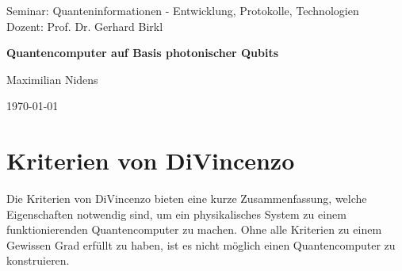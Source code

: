 \documentclass[11pt]{article}
\begin{document}
\begin{titlepage}
    \centering
    \vspace*{2cm}
    
    {\Large Seminar: Quanteninformationen - Entwicklung, Protokolle, Technologien} \\
    \vspace{0.5cm}
    {\Large Dozent: Prof. Dr. Gerhard Birkl} \\
    
    \vspace{4cm}
    
    {\Huge \bfseries Quantencomputer auf Basis photonischer Qubits} \\
    
    \vspace{4cm}
    
    {\Large Maximilian Nidens} \\
    
    \vfill
    
    {\large \today}
\end{titlepage}
\section{Kriterien von DiVincenzo}
Die Kriterien von DiVincenzo \cite{DiVincenzo_2000} bieten eine kurze Zusammenfassung, welche Eigenschaften notwendig sind, um ein physikalisches System
zu einem funktionierenden Quantencomputer zu machen. Ohne alle Kriterien zu einem Gewissen Grad erfüllt zu haben, ist es nicht
möglich einen Quantencomputer zu konstruieren.
\end{document}
